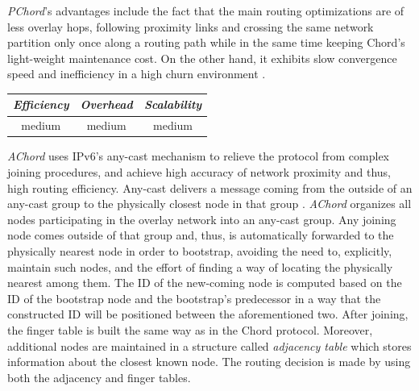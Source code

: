 \emph{PChord}’s advantages include the fact that the main routing optimizations are of
less overlay hops, following proximity links and crossing the same network
partition only once along a routing path while in the same time keeping Chord's
light-weight maintenance cost. On the other hand, it exhibits slow convergence
speed and inefficiency in a high churn environment \cite{DK2006}.

\begin{center}
\begin{tabular}{ccc}
\emph{Efficiency} & \emph{Overhead} & \emph{Scalability} \\
\hline
medium &
medium &
medium
\end{tabular}
\end{center}

\emph{AChord} \cite{DK2006} uses IPv6's any-cast mechanism to
relieve the protocol from complex joining procedures, and achieve high accuracy
of network proximity and thus, high routing efficiency. Any-cast delivers a message
coming from the outside of an any-cast group to the physically closest node in
that group \cite{M2002}. \emph{AChord} organizes all nodes participating in the
overlay network into an any-cast group. Any joining node comes outside of that group
and, thus, is
automatically forwarded to the physically nearest node in order to bootstrap,
avoiding the need to, explicitly, maintain such nodes, and the effort of finding
a way of locating the physically nearest among them. The ID of the new-coming
node is computed based on the ID of the bootstrap node and the bootstrap's
predecessor in a way that the constructed ID will be positioned between the
aforementioned two. After joining, the finger table is built the same way as in
the Chord protocol. Moreover, additional nodes are maintained in a structure
called \emph{adjacency table} which stores information about the closest known
node. The routing decision is made by using both the adjacency and finger
tables.

